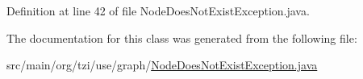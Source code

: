 Definition at line 42 of file Node\-Does\-Not\-Exist\-Exception.\-java.



The documentation for this class was generated from the following file\-:\begin{DoxyCompactItemize}
\item 
src/main/org/tzi/use/graph/\hyperlink{_node_does_not_exist_exception_8java}{Node\-Does\-Not\-Exist\-Exception.\-java}\end{DoxyCompactItemize}
